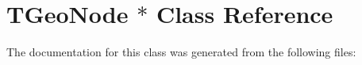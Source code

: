 \hypertarget{class_t_geo_node_01_5}{
\section{TGeoNode $\ast$ Class Reference}
\label{class_t_geo_node_01_5}
}


The documentation for this class was generated from the following files: